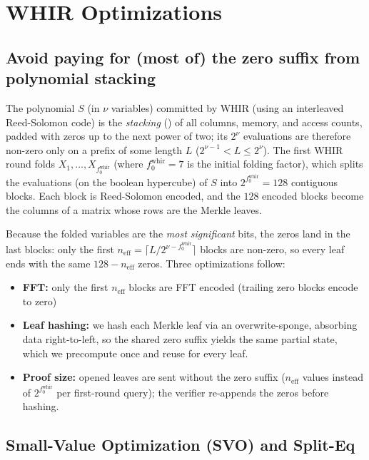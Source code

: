 \documentclass{article}
\theoremstyle{definition}
\begin{document}
\clearpage
\appendix

\section{WHIR Optimizations}


\subsection{Avoid paying for (most of) the zero suffix from polynomial stacking}\label{sec:zero-suffix}

The polynomial $S$ (in $\nu$ variables) committed by WHIR (using an interleaved Reed-Solomon code) is the \emph{stacking} () of all columns, memory, and access counts, padded with zeros up to the next power of two; its $2^\nu$ evaluations are therefore non-zero only on a prefix of some length $L$ ($2^{\nu - 1} < L \leq 2^\nu$). The first WHIR round folds $X_1, \ldots, X_{f_0^\text{whir}}$ (where $f_0^\text{whir} = 7$ is the initial folding factor), which splits the evaluations (on the boolean hypercube) of $S$ into $2^{f_0^\text{whir}} = 128$ contiguous blocks. Each block is Reed-Solomon encoded, and the $128$ encoded blocks become the columns of a matrix whose rows are the Merkle leaves.

Because the folded variables are the \emph{most significant} bits, the zeros land in the last blocks: only the first $n_\text{eff} = \lceil L / 2^{\nu - f_0^\text{whir}} \rceil$ blocks are non-zero, so every leaf ends with the same $128 - n_\text{eff}$ zeros. Three optimizations follow:

\begin{itemize}
    \item \textbf{FFT:} only the first $n_\text{eff}$ blocks are FFT encoded (trailing zero blocks encode to zero)
    \item \textbf{Leaf hashing:} we hash each Merkle leaf via an overwrite-sponge, absorbing data right-to-left, so the shared zero suffix yields the same partial state, which we precompute once and reuse for every leaf.
    \item \textbf{Proof size:} opened leaves are sent without the zero suffix ($n_\text{eff}$ values instead of $2^{f_0^\text{whir}}$ per first-round query); the verifier re-appends the zeros before hashing.
\end{itemize}

\subsection{Small-Value Optimization (SVO) and Split-Eq}\label{sec:svo}
\end{document}

